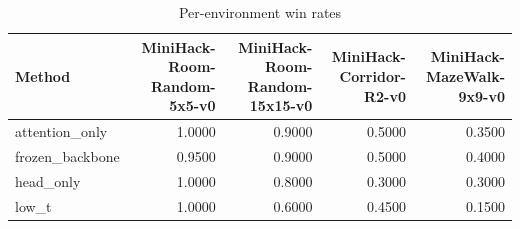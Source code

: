 \begin{table}[htbp]
\centering
\caption{Per-environment win rates}
\label{tab:per-env}
\begin{tabular}{lrrrr}
\toprule
\textbf{Method} & \textbf{MiniHack-Room-Random-5x5-v0} & \textbf{MiniHack-Room-Random-15x15-v0} & \textbf{MiniHack-Corridor-R2-v0} & \textbf{MiniHack-MazeWalk-9x9-v0} \\
\midrule
attention\_only & 1.0000 & 0.9000 & 0.5000 & 0.3500 \\
frozen\_backbone & 0.9500 & 0.9000 & 0.5000 & 0.4000 \\
head\_only & 1.0000 & 0.8000 & 0.3000 & 0.3000 \\
low\_t & 1.0000 & 0.6000 & 0.4500 & 0.1500 \\
\bottomrule
\end{tabular}
\end{table}